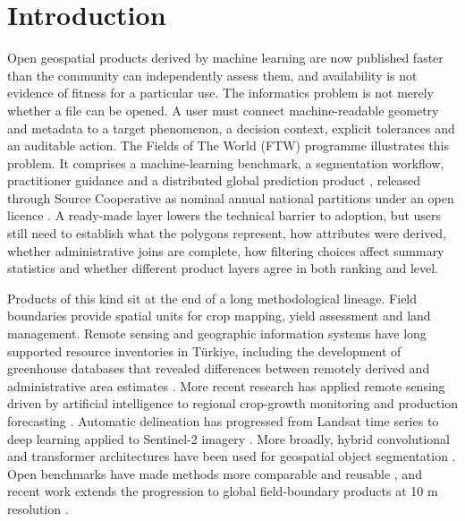 \documentclass[pdflatex,sn-basic]{sn-jnl}
\begin{document}

\maketitle

\section{Introduction}\label{sec:introduction}

Open geospatial products derived by machine learning are now published faster than the community can independently assess them, and availability is not evidence of fitness for a particular use. The informatics problem is not merely whether a file can be opened. A user must connect machine-readable geometry and metadata to a target phenomenon, a decision context, explicit tolerances and an auditable action. The Fields of The World (FTW) programme illustrates this problem. It comprises a machine-learning benchmark, a segmentation workflow, practitioner guidance and a distributed global prediction product \citep{corley_fields_2026,muhawenayo_prue_2026,robinson_first_2026}, released through Source Cooperative as nominal annual national partitions under an open licence \citep{fields_of_the_world_global_2026}. A ready-made layer lowers the technical barrier to adoption, but users still need to establish what the polygons represent, how attributes were derived, whether administrative joins are complete, how filtering choices affect summary statistics and whether different product layers agree in both ranking and level.

Products of this kind sit at the end of a long methodological lineage. Field boundaries provide spatial units for crop mapping, yield assessment and land management. Remote sensing and geographic information systems have long supported resource inventories in Türkiye, including the development of greenhouse databases that revealed differences between remotely derived and administrative area estimates \citep{sonmez_use_2006}. More recent research has applied remote sensing driven by artificial intelligence to regional crop-growth monitoring and production forecasting \citep{wang_analysis_2026}. Automatic delineation has progressed from Landsat time series \citep{white_contemporary_2015,yan_conterminous_2016} to deep learning applied to Sentinel-2 imagery \citep{persello_delineation_2019,diakogiannis_resunet-_2020,waldner_deep_2020,waldner_detect_2021}. More broadly, hybrid convolutional and transformer architectures have been used for geospatial object segmentation \citep{bicakci_attransunet_2023}. Open benchmarks have made methods more comparable and reusable \citep{dandrimont_ai4boundaries_2023,kerner_fields_2025}, and recent work extends the progression to global field-boundary products at 10 m resolution \citep{corley_fields_2026,muhawenayo_prue_2026,robinson_first_2026}.
\end{document}
